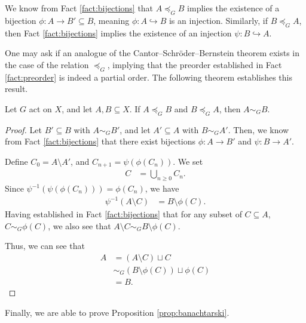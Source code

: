 We know from Fact \ref{fact:bijections} that $A\preceq_{G}B$ implies the existence of a bijection $\phi\colon A\rightarrow B'\subseteq B$, meaning $\phi\colon A\hookrightarrow B$ is an injection. Similarly, if $B\preceq_{G}A$, then Fact \ref{fact:bijections} implies the existence of an injection $\psi\colon B\hookrightarrow A$.\newline

One may ask if an analogue of the Cantor--Schröder--Bernstein theorem exists in the case of the relation $\preceq_{G}$, implying that the preorder established in Fact \ref{fact:preorder} is indeed a partial order. The following theorem establishes this result.
\begin{theorem}
  Let $G$ act on $X$, and let $A,B\subseteq X$. If $A\preceq_{G}B$ and $B\preceq_{G}A$, then $A\sim_{G}B$.\label{thm:csb_for_equidecomposability}
\end{theorem}
\begin{proof}
  Let $B'\subseteq B$ with $A\sim_{G}B'$, and let $A'\subseteq A$ with $B\sim_{G}A'$. Then, we know from Fact \ref{fact:bijections} that there exist bijections $\phi\colon A\rightarrow B'$ and $\psi\colon B\rightarrow A'$.\newline

  Define $C_0 = A\setminus A'$, and $C_{n+1} = \psi\left(\phi\left(C_n\right)\right)$. We set
  \begin{align*}
    C &= \bigcup_{n\geq 0}C_{n}.
  \end{align*}
  Since $\psi^{-1}\left(\psi\left(\phi\left(C_n\right)\right)\right) = \phi\left(C_n\right)$, we have
  \begin{align*}
    \psi^{-1}\left(A\setminus C\right) &= B\setminus \phi(C).
  \end{align*}
  Having established in Fact \ref{fact:bijections} that for any subset of $C\subseteq A$, $C\sim_{G} \phi(C)$, we also see that $A\setminus C \sim_{G} B\setminus \phi(C)$.\newline

  Thus, we can see that
  \begin{align*}
    A &= \left(A\setminus C\right)\sqcup C\\
      &\sim_{G}\left(B\setminus \phi(C)\right)\sqcup \phi(C)\\
      &= B.
  \end{align*}
\end{proof}

Finally, we are able to prove Proposition \ref{prop:banachtarski}.

